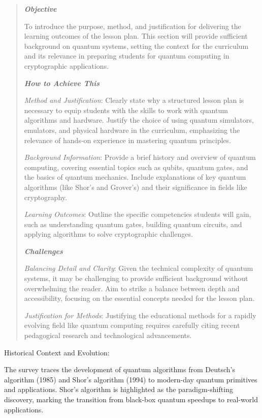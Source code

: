 \begin{quote}\itshape
\textbf{\emph{Objective}}

To introduce the purpose, method, and justification for delivering the learning outcomes of the lesson plan. This section will provide sufficient background on quantum systems, setting the context for the curriculum and its relevance in preparing students for quantum computing in cryptographic applications.

\textbf{\emph{How to Achieve This}}

\emph{Method and Justification}: Clearly state why a structured lesson plan is necessary to equip students with the skills to work with quantum algorithms and hardware. Justify the choice of using quantum simulators, emulators, and physical hardware in the curriculum, emphasizing the relevance of hands-on experience in mastering quantum principles.

\emph{Background Information}: Provide a brief history and overview of quantum computing, covering essential topics such as qubits, quantum gates, and the basics of quantum mechanics. Include explanations of key quantum algorithms (like Shor’s and Grover’s) and their significance in fields like cryptography.

\emph{Learning Outcomes}: Outline the specific competencies students will gain, such as understanding quantum gates, building quantum circuits, and applying algorithms to solve cryptographic challenges.

\textbf{\emph{Challenges}}

\emph{Balancing Detail and Clarity}: Given the technical complexity of quantum systems, it may be challenging to provide sufficient background without overwhelming the reader. Aim to strike a balance between depth and accessibility, focusing on the essential concepts needed for the lesson plan.

\emph{Justification for Methods}: Justifying the educational methods for a rapidly evolving field like quantum computing requires carefully citing recent pedagogical research and technological advancements.
\end{quote}\ignorespacesafterend


Historical Context and Evolution:

The survey traces the development of quantum algorithms from Deutsch's algorithm (1985) and Shor's algorithm (1994) to modern-day quantum primitives and applications.
    Shor's algorithm is highlighted as the paradigm-shifting discovery, marking the transition from black-box quantum speedups to real-world applications.

